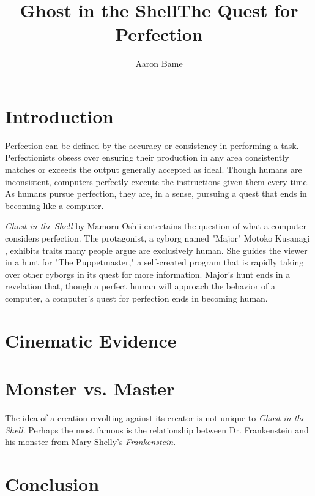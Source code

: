 \documentclass[a4paper]{article}
\title{Ghost in the Shell\n The Quest for Perfection}
\author{Aaron Bame}
\begin{document}
\maketitle

\section{Introduction}
Perfection can be defined by the accuracy or consistency in performing a task. Perfectionists obsess over ensuring their production in any area consistently matches or exceeds the output generally accepted as ideal. Though humans are inconsistent, computers perfectly execute the instructions given them every time. As humans pursue perfection, they are, in a sense, pursuing a quest that ends in becoming like a computer.

\textit{Ghost in the Shell} by Mamoru Oshii entertains the question of what a computer considers perfection. The protagonist, a cyborg named "Major" Motoko Kusanagi , exhibits traits many people argue are exclusively human. She guides the viewer in a hunt for "The Puppetmaster," a self-created program that is rapidly taking over other cyborgs in its quest for more information. Major's hunt ends in a revelation that, though a perfect human will approach the behavior of a computer, a computer's quest for perfection ends in becoming human.

\section{Cinematic Evidence}

\section{Monster vs. Master}
The idea of a creation revolting against its creator is not unique to \textit{Ghost in the Shell}. Perhaps the most famous is the relationship between Dr. Frankenstein and his monster from Mary Shelly's \textit{Frankenstein}.

\section{Conclusion}
\end{document}
